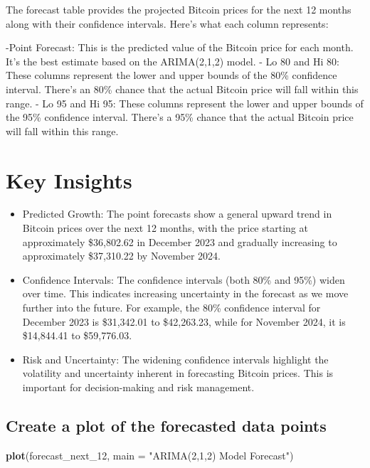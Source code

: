 \documentclass[
]{book}
\newenvironment{Shaded}{\begin{snugshade}}{\end{snugshade}}
\newcommand{\AttributeTok}[1]{\textcolor[rgb]{0.13,0.29,0.53}{#1}}
\newcommand{\FunctionTok}[1]{\textcolor[rgb]{0.13,0.29,0.53}{\textbf{#1}}}
\newcommand{\NormalTok}[1]{#1}
\newcommand{\StringTok}[1]{\textcolor[rgb]{0.31,0.60,0.02}{#1}}
\providecommand{\tightlist}{%
  \setlength{\itemsep}{0pt}\setlength{\parskip}{0pt}}
\begin{document}
The forecast table provides the projected Bitcoin prices for the next 12 months along with their confidence intervals. Here's what each column represents:

-Point Forecast: This is the predicted value of the Bitcoin price for each month. It's the best estimate based on the ARIMA(2,1,2) model.
- Lo 80 and Hi 80: These columns represent the lower and upper bounds of the 80\% confidence interval. There's an 80\% chance that the actual Bitcoin price will fall within this range.
- Lo 95 and Hi 95: These columns represent the lower and upper bounds of the 95\% confidence interval. There's a 95\% chance that the actual Bitcoin price will fall within this range.

\section{Key Insights}\label{key-insights}

\begin{itemize}
\tightlist
\item
  Predicted Growth: The point forecasts show a general upward trend in Bitcoin prices over the next 12 months, with the price starting at approximately \$36,802.62 in December 2023 and gradually increasing to approximately \$37,310.22 by November 2024.
\item
  Confidence Intervals: The confidence intervals (both 80\% and 95\%) widen over time. This indicates increasing uncertainty in the forecast as we move further into the future. For example, the 80\% confidence interval for December 2023 is \$31,342.01 to \$42,263.23, while for November 2024, it is \$14,844.41 to \$59,776.03.
\item
  Risk and Uncertainty: The widening confidence intervals highlight the volatility and uncertainty inherent in forecasting Bitcoin prices. This is important for decision-making and risk management.
\end{itemize}

\subsection{Create a plot of the forecasted data points}\label{create-a-plot-of-the-forecasted-data-points}

\begin{Shaded}
\begin{Highlighting}[]
\FunctionTok{plot}\NormalTok{(forecast\_next\_12, }\AttributeTok{main =} \StringTok{"ARIMA(2,1,2) Model Forecast"}\NormalTok{)}
\end{Highlighting}
\end{Shaded}
\end{document}
